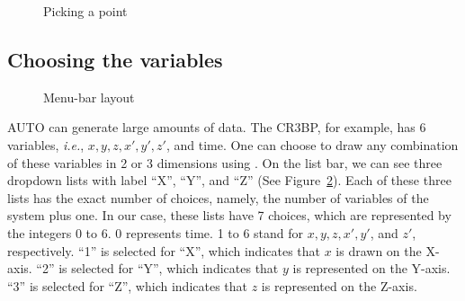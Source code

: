 \begin{figure}[!htmb]
\centering
{}
\caption{Picking a point }
\label{fig:flq}
\end{figure}

\subsection{Choosing the variables}

\begin{figure}[!htmb]
\centering
{}
\caption{Menu-bar layout}
\label{fig:mnbar}
\end{figure}

AUTO can generate large amounts of data. The CR3BP, for example, has 6 variables, \textit{i.e.}, $x,y,
z, x', y', z'$, and time. One can choose to draw any combination of these variables in 2  
or 3 dimensions using \PLAUT. On the list bar,  
we can see three {dropdown lists} with label ``X'', ``Y'', and ``Z'' (See Figure~\ref{fig:mnbar}).
Each of these three lists has the exact number of choices, namely, the number of variables of the system plus one.
In our case, these lists have 7 choices, which are represented by the integers 0 to 6. 
0 represents time. 1 to 6 stand for $x, y, z, x', y'$, and $z'$, respectively. 
``1'' is selected for ``X'', which indicates that $x$ is drawn on the X-axis. 
``2'' is selected for ``Y'',  which indicates that $y$ is represented on the Y-axis. 
``3'' is selected for ``Z'',  which indicates that $z$ is represented on the Z-axis. 

